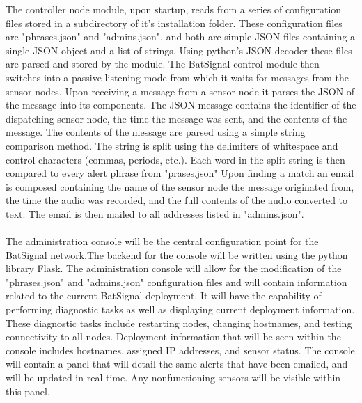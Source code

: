 \documentclass[11pt,a4paper]{article}
\begin{document}
The controller node module, upon startup, reads from a series of configuration files stored in a subdirectory of it's installation folder. These configuration files are "phrases.json" and "admins.json", and both are simple JSON files containing a single JSON object and a list of strings. Using python's JSON decoder these files are parsed and stored by the module. The BatSignal control module then switches into a passive listening mode from which it waits for messages from the sensor nodes. Upon receiving a message from a sensor node it parses the JSON of the message into its components. The JSON message contains the identifier of the dispatching sensor node, the time the message was sent, and the contents of the message. The contents of the message are parsed using a simple string comparison method. The string is split using the delimiters of whitespace and control characters (commas, periods, etc.). Each word in the split string is then compared to every alert phrase from "prases.json"  Upon finding a match an email is composed containing the name of the sensor node the message originated from, the time the audio was recorded, and the full contents of the audio converted to text. The email is then mailed to all addresses listed in "admins.json".  \\\\
The administration console will be the central configuration point for the BatSignal network.The backend for the console will be written using the python library Flask.  The administration console will allow for the modification of the "phrases.json" and "admins.json" configuration files and will contain information related to the current BatSignal deployment.  It will have the capability of performing diagnostic tasks as well as displaying current deployment information.  These diagnostic tasks include restarting nodes, changing hostnames, and testing connectivity to all nodes.  Deployment information that will be seen within the console includes hostnames, assigned IP addresses, and sensor status.  The console will contain a panel that will detail the same alerts that have been emailed, and will be updated in real-time.  Any nonfunctioning sensors will be visible within this panel.      \\\\ 
\end{document}
